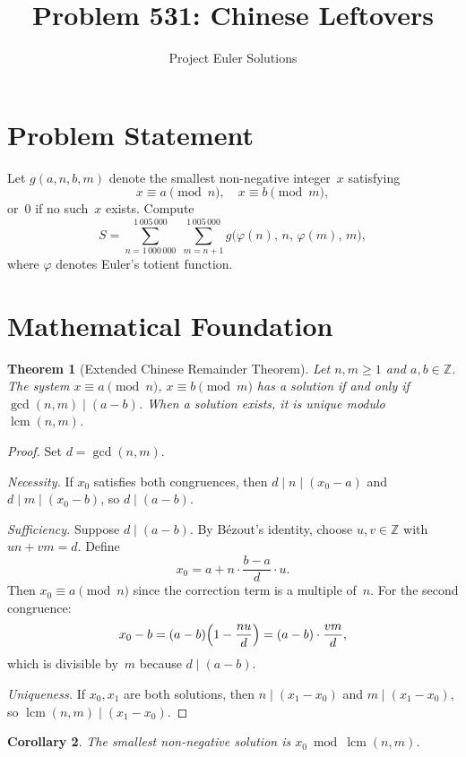 \documentclass[11pt]{article}
\title{Problem 531: Chinese Leftovers}
\author{Project Euler Solutions}
\date{}
\newtheorem{theorem}{Theorem}
\newtheorem{corollary}[theorem]{Corollary}
\begin{document}
\maketitle

\section{Problem Statement}

Let $g(a,n,b,m)$ denote the smallest non-negative integer~$x$ satisfying
\[
x \equiv a \pmod{n}, \quad x \equiv b \pmod{m},
\]
or~$0$ if no such~$x$ exists. Compute
\[
S = \sum_{n=1\,000\,000}^{1\,005\,000}\;\sum_{m=n+1}^{1\,005\,000} g\bigl(\varphi(n),\,n,\,\varphi(m),\,m\bigr),
\]
where $\varphi$ denotes Euler's totient function.

\section{Mathematical Foundation}

\begin{theorem}[Extended Chinese Remainder Theorem]\label{thm:ecrt}
Let $n,m \ge 1$ and $a,b \in \mathbb{Z}$. The system $x \equiv a \pmod{n}$, $x \equiv b \pmod{m}$ has a solution if and only if $\gcd(n,m) \mid (a-b)$. When a solution exists, it is unique modulo $\operatorname{lcm}(n,m)$.
\end{theorem}

\begin{proof}
Set $d = \gcd(n,m)$.

\emph{Necessity.} If $x_0$ satisfies both congruences, then $d \mid n \mid (x_0-a)$ and $d \mid m \mid (x_0-b)$, so $d \mid (a-b)$.

\emph{Sufficiency.} Suppose $d \mid (a-b)$. By B\'{e}zout's identity, choose $u,v \in \mathbb{Z}$ with $un + vm = d$. Define
\[
x_0 = a + n \cdot \frac{b-a}{d}\cdot u.
\]
Then $x_0 \equiv a \pmod{n}$ since the correction term is a multiple of~$n$. For the second congruence:
\[
x_0 - b = (a-b)\Bigl(1 - \frac{nu}{d}\Bigr) = (a-b)\cdot\frac{vm}{d},
\]
which is divisible by~$m$ because $d \mid (a-b)$.

\emph{Uniqueness.} If $x_0,x_1$ are both solutions, then $n \mid (x_1 - x_0)$ and $m \mid (x_1 - x_0)$, so $\operatorname{lcm}(n,m) \mid (x_1 - x_0)$.
\end{proof}

\begin{corollary}
The smallest non-negative solution is $x_0 \bmod \operatorname{lcm}(n,m)$.
\end{corollary}
\end{document}
